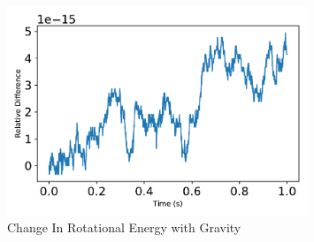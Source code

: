 \begin{figure}[htbp]\centerline{\includegraphics[width=0.8\textwidth]{AutoTeX/ChangeInRotationalEnergy}}\caption{Change In Rotational Energy with Gravity}\label{fig:ChangeInRotationalEnergy}\end{figure}